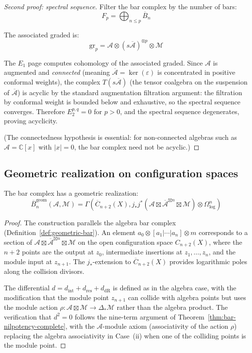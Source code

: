 \begin{proof}[Second proof: spectral sequence]
Filter the bar complex by the number of bars:
\[
F_p = \bigoplus_{n \leq p} \overline{B}_n
\]

The associated graded is:
\[
\text{gr}_p = \mathcal{A} \otimes (s\overline{\mathcal{A}})^{\otimes p} \otimes \mathcal{M}
\]

The $E_1$ page computes cohomology of the associated graded.  Since $\mathcal{A}$ is augmented and \emph{connected} (meaning $\overline{\mathcal{A}} = \ker(\varepsilon)$ is concentrated in positive conformal weights), the complex $T(s\overline{\mathcal{A}})$ (the tensor coalgebra on the suspension of $\overline{\mathcal{A}}$) is acyclic by the standard augmentation filtration argument: the filtration by conformal weight is bounded below and exhaustive, so the spectral sequence converges. Therefore $E_2^{p,q} = 0$ for $p > 0$, and the spectral sequence degenerates, proving acyclicity.

(The connectedness hypothesis is essential: for non-connected algebras such as $\mathcal{A} = \mathbb{C}[x]$ with $|x| = 0$, the bar complex need not be acyclic.)
\end{proof}

\subsection{Geometric realization on configuration spaces}

\begin{theorem}
\label{thm:geometric-bar-module}
The bar complex has a geometric realization:
\[
\overline{B}_n^{\text{geom}}(\mathcal{A}, \mathcal{M}) = \Gamma(\overline{C}_{n+2}(X), j_*j^*(\mathcal{A} \boxtimes \overline{\mathcal{A}}^{\boxtimes n} \boxtimes \mathcal{M}) \otimes \Omega^n_{\log})
\]
\end{theorem}

\begin{proof}
The construction parallels the algebra bar complex (Definition~\ref{def:geometric-bar}).  An element $a_0 \otimes [a_1|\cdots|a_n] \otimes m$ corresponds to a section of $\mathcal{A} \boxtimes \overline{\mathcal{A}}^{\boxtimes n} \boxtimes \mathcal{M}$ on the open configuration space $C_{n+2}(X)$, where the $n+2$ points are the output at $z_0$, intermediate insertions at $z_1, \ldots, z_n$, and the module input at $z_{n+1}$.  The $j_*$-extension to $\overline{C}_{n+2}(X)$ provides logarithmic poles along the collision divisors.

The differential $d = d_{\mathrm{int}} + d_{\mathrm{res}} + d_{\mathrm{dR}}$ is defined as in the algebra case, with the modification that the module point $z_{n+1}$ can collide with algebra points but uses the module action $\rho\colon \mathcal{A} \boxtimes \mathcal{M} \to \Delta_*\mathcal{M}$ rather than the algebra product.  The verification that $d^2 = 0$ follows the nine-term argument of Theorem~\ref{thm:bar-nilpotency-complete}, with the $\mathcal{A}$-module axiom (associativity of the action $\rho$) replacing the algebra associativity in Case~(ii) when one of the colliding points is the module point.
\end{proof}


